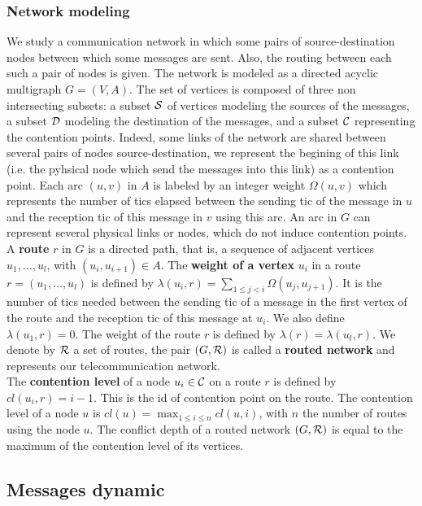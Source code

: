\documentclass[english]{article}
\begin{document}
  \subsubsection{Network modeling}
  We study a communication network in which some pairs of source-destination nodes between which some messages are sent. Also, the routing between each such a pair of nodes is given.
The network is modeled as a directed acyclic multigraph $G=(V,A)$. The set of vertices is composed of three non intersecting subsets: a subset ${\cal S}$ of vertices modeling the sources of the messages, a subset ${\cal D}$ modeling the destination of the messages, and a subset ${\cal C}$ representing the contention points. Indeed, some links of the network are shared between several pairs of nodes source-destination, we represent the begining of this link (i.e. the pyhsical node which send the messages into this link) as a contention point. Each arc  $(u,v)$ in $A$ is labeled by an integer weight $\Omega(u,v)$ which represents the number of tics elapsed between the sending tic of the message in $u$ and the reception tic of this message in $v$ using this arc. An arc in $G$ can represent several physical links or nodes, which do not induce contention points.\\
  A {\bf route} $r$ in $G$ is a directed path, that is, a sequence of adjacent vertices $u_1, \ldots , u_{l}$, with $(u_i,u_{i+1}) \in A$.  The {\bf weight of a vertex} $u_i$ in a route $r=(u_1,\dots,u_l)$ is defined by $\lambda(u_i,r)= \sum\limits_{1 \leq j <i} \Omega(u_j, u_{j+1})$. It is the number of tics needed between the sending tic of a message in the first vertex of the route and the reception tic of this message at $u_i$. We also define $\lambda(u_1,r)=0$. The weight of the route $r$ is defined by $\lambda (r)= \lambda (u_l,r)$.
We denote by ${\cal R}$ a set of routes, the pair $(G,{\cal R})$ is called a {\bf routed network} and represents our telecommunication network.\\
The \textbf{contention level} of a node $u_i \in {\cal C}$ on a route $r$ is defined by $cl(u_i,r) = i-1$. This is the id of contention point on the route. The contention level of a node $u$ is $cl(u) = \max_{1\leq i\leq n} cl(u,i)$, with $n$ the number of routes using the node $u$.
The conflict depth of a routed network $(G,{\cal R})$ is equal to the maximum of the contention level of its vertices.
 \subsection{Messages dynamic}
	     
\end{document}
